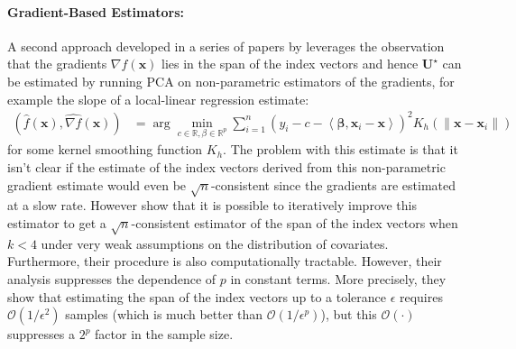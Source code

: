 \documentclass[final,12pt]{colt2018} %
\newcommand{\R}{\mathbb{R}}
\renewcommand\v[1]{{\ensuremath{\boldsymbol{#1}}}}
\newcommand\ip[1]{\left\langle #1 \right\rangle}
\newcommand{\bigoh}[1]{\mathcal{O}\left( #1 \right)}
\begin{document}
\paragraph{Gradient-Based Estimators:}
A second approach developed in a series of papers by \citet{hristache2001direct,hristache2001structure,dalalyan2008new} leverages the observation that the gradients $\nabla f(\v x)$ lies in the span of the index vectors and hence $\mathcal{\v U^\star}$ can be estimated by running PCA on non-parametric estimators of the gradients, for example the slope of a local-linear regression estimate:
\begin{align*}
    (\hat f(\v x), \widehat{\nabla f}(\v x))
& = \arg \min_{c \in \R, \beta \in \R^p} \sum_{i=1}^n \left( y_i - c - \ip{ \v \beta, \v x_i - \v x} \right)^2 K_h \left( \| \v x - \v x_i \| \right)
\end{align*}
for some kernel smoothing function $K_h$. The problem with this estimate is that it isn't clear if the estimate of the index vectors derived from this non-parametric gradient estimate would even be $\sqrt{n}$-consistent since the gradients are estimated at a slow rate. However \citet{hristache2001direct,hristache2001structure,dalalyan2008new} show that it is possible to iteratively improve this estimator to get a $\sqrt{n}$-consistent estimator of the span of the index vectors when $k<4$ under very weak assumptions on the distribution of covariates. Furthermore, their procedure is also computationally tractable. However, their analysis suppresses the dependence of $p$ in constant terms. More precisely, they show that estimating the span of the index vectors up to a tolerance $\epsilon$ requires $\bigoh{1/\epsilon^2}$ samples (which is much better than $\bigoh{1/\epsilon^p}$), but this $\bigoh{\cdot}$ suppresses a $2^p$ factor in the sample size.
\end{document}
